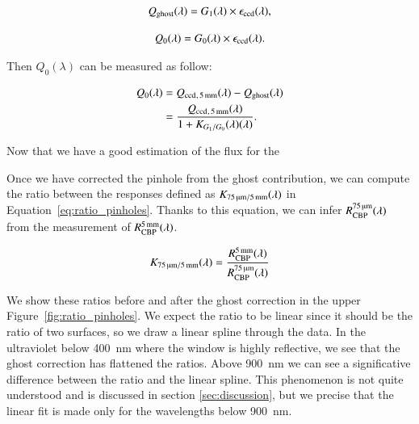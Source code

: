 \begin{equation}
    Q_{\mathrm{ghost}}(\lambda) = G_1(\lambda) \times \epsilon_{\mathrm{ccd}}(\lambda), 
    \label{eq:qghost}
\end{equation}

\begin{equation}
    Q_0(\lambda) = G_0(\lambda) \times \epsilon_{\mathrm{ccd}}(\lambda).
    \label{eq:qmain}
\end{equation}

\noindent Then $Q_0(\lambda)$ can be measured as follow:

\begin{equation}
\begin{aligned}
    Q_0(\lambda) & = Q_{\mathrm{ccd}}{}_{, \, \SI{5}{\milli\meter}}(\lambda) - Q_{\mathrm{ghost}}(\lambda) \\
    & = \frac{Q_{\mathrm{ccd}}{}_{, \, \SI{5}{\milli\meter}}(\lambda)}{1 + K_{G_1/G_0}(\lambda)(\lambda)}.
    \label{eq:qccd_5mm}
\end{aligned}
\end{equation}

\noindent Now that we have a good estimation of the flux for the 

\noindent Once we have corrected the \bpinhole pinhole from the ghost contribution, we can compute the ratio between the \SD responses defined as $K_\mathrm{\SI{75}{\micro\meter}/\SI{5}{\milli\meter}}(\lambda)$ in Equation~\ref{eq:ratio_pinholes}. Thanks to this equation, we can infer $R_{\mathrm{CBP}}^{\SI{75}{\micro\meter}}(\lambda)$ from the measurement of $R_{\mathrm{CBP}}^{\SI{5}{\milli\meter}}(\lambda)$.

\begin{equation}
    K_\mathrm{\SI{75}{\micro\meter}/\SI{5}{\milli\meter}}(\lambda) = \frac{R_{\mathrm{CBP}}^{\SI{5}{\milli\meter}}(\lambda)}{R_{\mathrm{CBP}}^{\SI{75}{\micro\meter}}(\lambda)}
    \label{eq:ratio_pinholes}
\end{equation}

We show these ratios before and after the ghost correction in the upper Figure~\ref{fig:ratio_pinholes}. We expect the ratio to be linear since it should be the ratio of two surfaces, so we draw a linear spline through the data. In the ultraviolet below \SI{400}{\nm} where the window is highly reflective, we see that the ghost correction has flattened the ratios. Above \SI{900}{\nm} we can see a significative difference between the ratio and the linear spline. This phenomenon is not quite understood and is discussed in section \ref{sec:discussion}, but we precise that the linear fit is made only for the wavelengths below \SI{900}{\nano\meter}. 

